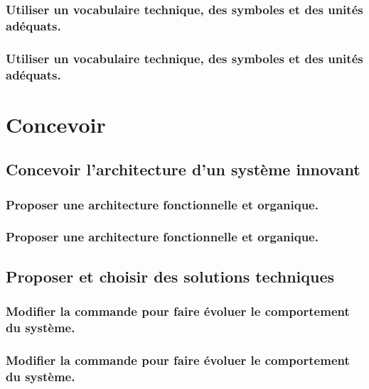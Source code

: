 \documentclass[10pt,fleqn]{book}
\newcommand{\repRel}{../..}
\newcommand{\repStyle}{\repRel/Style}
\newcommand{\td}{fichier_td}
\newcommand{\repExos}{\repRel/ExercicesCompetences}
\newcommand{\repExo}{dossier}
\begin{document}
\renewcommand{\repExo}{\repExos/E2_ProduireInformation/E2_05_Dessin2D/1017_Dessin2D}
\renewcommand{\td}{1017_Dessin2D}
\graphicspath{{\repStyle/png/}{\repExo/images/}}


\renewcommand{\repExo}{\repExos/E2_ProduireInformation/E2_05_Dessin2D/1020_PompeEnsieta}
\renewcommand{\td}{1020_PompeEnsieta}
\graphicspath{{\repStyle/png/}{\repExo/images/}}


\subsection{Utiliser un vocabulaire technique, des symboles et des unités adéquats.} 

\subsection{Utiliser un vocabulaire technique, des symboles et des unités adéquats.} 

\chapter{Concevoir} 

\section{Concevoir l'architecture d'un système innovant} 

\subsection{Proposer une architecture fonctionnelle et organique.} 

\subsection{Proposer une architecture fonctionnelle et organique.} 

\section{Proposer et choisir des solutions techniques} 

\subsection{Modifier la commande pour faire évoluer le comportement du système. } 

\subsection{Modifier la commande pour faire évoluer le comportement du système. } 
\end{document}
